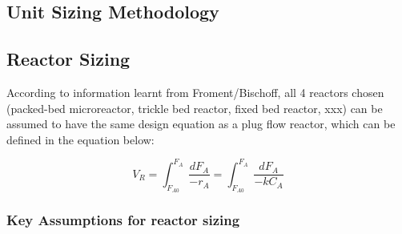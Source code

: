 \begin{landscape}
\section{Unit Sizing Methodology}
\subsection{Reactor Sizing}
According to information learnt from Froment/Bischoff, all 4 reactors chosen (packed-bed microreactor, trickle bed reactor, fixed bed reactor, xxx) can be assumed to have the same design equation as a plug flow reactor, which can be defined in the equation below:

\begin{equation}
    V_R = \int_{F_{A0}}^{F_{A}} \frac{dF_A}{-r_A} = \int_{F_{A0}}^{F_{A}} \frac{dF_A}{-kC_A}
    \label{reactor_sizing}
\end{equation}

\subsubsection{Key Assumptions for reactor sizing}

\end{landscape}
